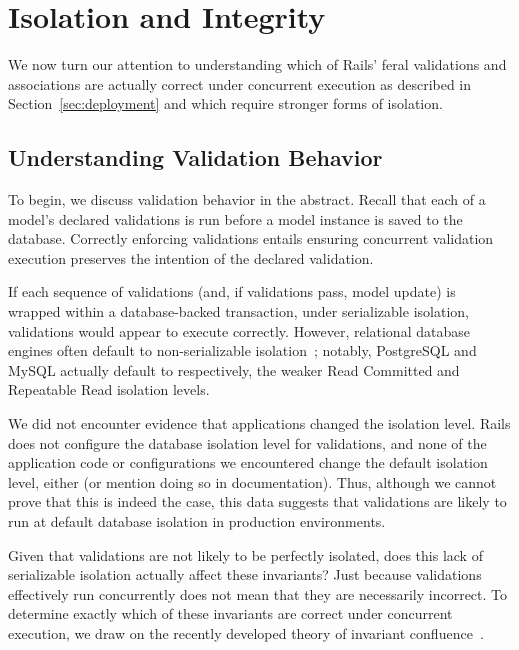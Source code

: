 
\section{Isolation and Integrity}
\label{sec:apps}

We now turn our attention to understanding which of Rails' feral
validations and associations are actually correct under concurrent
execution as described in Section~\ref{sec:deployment} and which
require stronger forms of isolation.

\subsection{Understanding Validation Behavior}

To begin, we discuss validation behavior in the abstract. Recall that
each of a model's declared validations is run before a model instance
is saved to the database. Correctly enforcing validations entails
ensuring concurrent validation execution preserves the intention of
the declared validation.

 If each sequence of validations (and, if validations pass, model
update) is wrapped within a database-backed transaction, under
serializable isolation, validations would appear to execute
correctly. However, relational database engines often default to
non-serializable isolation~\cite{hat-vldb}; notably, PostgreSQL and
MySQL actually default to respectively, the weaker Read Committed and
Repeatable Read isolation levels.

We did not encounter evidence that applications changed the isolation
level. Rails does not configure the database isolation level for
validations, and none of the application code or configurations we
encountered change the default isolation level, either (or mention
doing so in documentation). Thus, although we cannot prove that this
is indeed the case, this data suggests that validations are likely
to run at default database isolation in production environments.

 Given that validations are
not likely to be perfectly isolated, does this lack of serializable
isolation actually affect these invariants?  Just because validations
effectively run concurrently does not mean that they are necessarily
incorrect. To determine exactly which of these invariants are correct
under concurrent execution, we draw on the recently developed theory
of invariant confluence~\cite{coord-avoid}.

